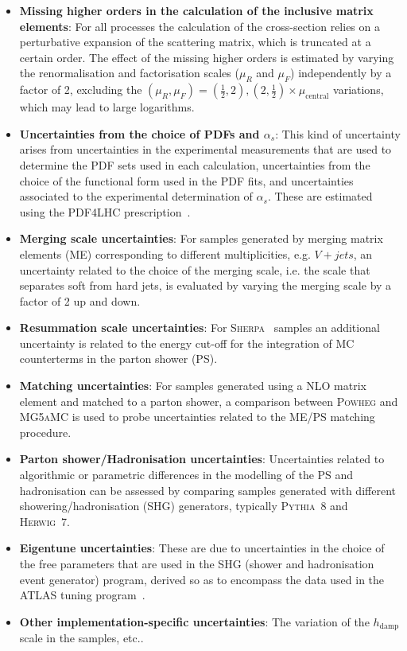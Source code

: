 \begin{itemize}
    \item \textbf{Missing higher orders in the calculation of the inclusive matrix elements}: For all processes the calculation of the cross-section relies on a perturbative expansion of the scattering matrix, which is truncated at a certain order. The effect of the missing higher orders is estimated by varying the renormalisation and factorisation scales ($\mu_R$ and $\mu_F$) independently by a factor of 2, excluding the $(\mu_R,\mu_F)=(\frac{1}{2},2),(2,\frac{1}{2})\times \mu_{\text{central}}$ variations, which may lead to large logarithms. 
    \item \textbf{Uncertainties from the choice of PDFs and $\alpha_s$}: This kind of uncertainty arises from uncertainties in the experimental measurements that are used to determine the PDF sets used in each calculation, uncertainties from the choice of the functional form used in the PDF fits, and uncertainties associated to the experimental determination of $\alpha_s$. These are estimated using the PDF4LHC prescription~\cite{Butterworth_2016}.
    \item \textbf{Merging scale uncertainties}: For samples generated by merging matrix elements (ME) corresponding to different multiplicities, e.g. $V+jets$, an uncertainty related to the choice of the merging scale, i.e. the scale that separates soft from hard jets, is evaluated by varying the merging scale by a factor of 2 up and down.
    \item \textbf{Resummation scale uncertainties}: For \textsc{Sherpa}~\cite{Gleisberg_2009} samples an additional uncertainty is related to the energy cut-off for the integration of MC counterterms in the parton shower (PS).
    \item \textbf{Matching uncertainties}: For samples generated using a NLO matrix element and matched to a parton shower, a comparison between \textsc{Powheg} and \textsc{MG5aMC} is used to probe uncertainties related to the ME/PS matching procedure.
    \item \textbf{Parton shower/Hadronisation uncertainties}: Uncertainties related to algorithmic or parametric differences in the modelling of the PS and hadronisation can be assessed by comparing samples generated with different showering/hadronisation (SHG) generators, typically \textsc{Pythia~8} and \textsc{Herwig~7}.  
    \item \textbf{Eigentune uncertainties}: These are due to uncertainties in the choice of the free parameters that are used in the SHG (shower and hadronisation event generator) program, derived so as to encompass the data used in the ATLAS tuning program~\cite{ATL-PHYS-PUB-2014-021}.
    \item \textbf{Other implementation-specific uncertainties}: The variation of the $h_{\text{damp}}$ scale in the  samples, etc..
\end{itemize}

